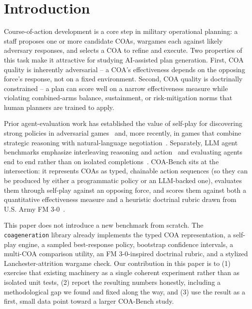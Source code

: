 \documentclass[sigconf]{acmart}
\begin{document}

\maketitle

\section{Introduction}

Course-of-action development is a core step in military operational planning: a staff proposes one or more candidate COAs, wargames each against likely adversary responses, and selects a COA to refine and execute. Two properties of this task make it attractive for studying AI-assisted plan generation. First, COA quality is inherently adversarial -- a COA's effectiveness depends on the opposing force's response, not on a fixed environment. Second, COA quality is doctrinally constrained -- a plan can score well on a narrow effectiveness measure while violating combined-arms balance, sustainment, or risk-mitigation norms that human planners are trained to apply.

Prior agent-evaluation work has established the value of self-play for discovering strong policies in adversarial games~\cite{silver2018alphazero,vinyals2019alphastar,brown2019superhuman} and, more recently, in games that combine strategic reasoning with natural-language negotiation~\cite{bakhtin2022cicero}. Separately, LLM agent benchmarks emphasize interleaving reasoning and action~\cite{yao2023react} and evaluating agents end to end rather than on isolated completions~\cite{liu2024agentbench}. COA-Bench sits at the intersection: it represents COAs as typed, chainable action sequences (so they can be produced by either a programmatic policy or an LLM-backed one), evaluates them through self-play against an opposing force, and scores them against both a quantitative effectiveness measure and a heuristic doctrinal rubric drawn from U.S. Army FM 3-0~\cite{fm30}.

This paper does not introduce a new benchmark from scratch. The \texttt{coageneration} library already implements the typed COA representation, a self-play engine, a sampled best-response policy, bootstrap confidence intervals, a multi-COA comparison utility, an FM 3-0-inspired doctrinal rubric, and a stylized Lanchester-attrition wargame check. Our contribution in this paper is to (1) exercise that existing machinery as a single coherent experiment rather than as isolated unit tests, (2) report the resulting numbers honestly, including a methodological gap we found and fixed along the way, and (3) use the result as a first, small data point toward a larger COA-Bench study.
\end{document}

